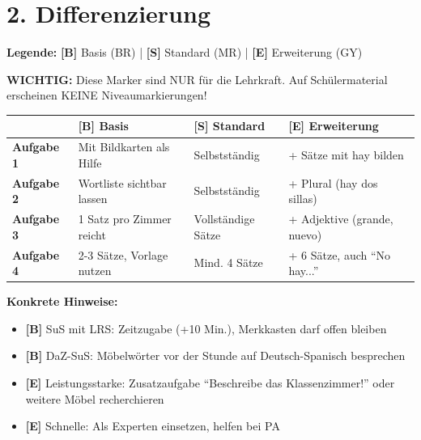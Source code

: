 \documentclass[11pt, a4paper]{article}
\newcommand{\B}{\textcolor{basis}{\textbf{[B]}}}
\newcommand{\Std}{\textcolor{standard}{\textbf{[S]}}}
\newcommand{\E}{\textcolor{erweiterung}{\textbf{[E]}}}
\begin{document}

\section*{2. Differenzierung}

\begin{differenzierung}
\textbf{Legende:} \B{} Basis (BR) | \Std{} Standard (MR) | \E{} Erweiterung (GY)

\vspace{0.5em}

\textbf{WICHTIG:} Diese Marker sind NUR für die Lehrkraft. Auf Schülermaterial erscheinen KEINE Niveaumarkierungen!
\end{differenzierung}

\vspace{1em}

\begin{tabularx}{\textwidth}{|l|X|X|X|}
\hline
& \B{} \textbf{Basis} & \Std{} \textbf{Standard} & \E{} \textbf{Erweiterung} \\
\hline
\textbf{Aufgabe 1} & Mit Bildkarten als Hilfe & Selbstständig & + Sätze mit hay bilden \\
\hline
\textbf{Aufgabe 2} & Wortliste sichtbar lassen & Selbstständig & + Plural (hay dos sillas) \\
\hline
\textbf{Aufgabe 3} & 1 Satz pro Zimmer reicht & Vollständige Sätze & + Adjektive (grande, nuevo) \\
\hline
\textbf{Aufgabe 4} & 2-3 Sätze, Vorlage nutzen & Mind. 4 Sätze & + 6 Sätze, auch ``No hay...'' \\
\hline
\end{tabularx}

\vspace{1em}

\textbf{Konkrete Hinweise:}
\begin{itemize}
    \item \B{} SuS mit LRS: Zeitzugabe (+10 Min.), Merkkasten darf offen bleiben
    \item \B{} DaZ-SuS: Möbelwörter vor der Stunde auf Deutsch-Spanisch besprechen
    \item \E{} Leistungsstarke: Zusatzaufgabe ``Beschreibe das Klassenzimmer!'' oder weitere Möbel recherchieren
    \item \E{} Schnelle: Als Experten einsetzen, helfen bei PA
\end{itemize}
\end{document}
